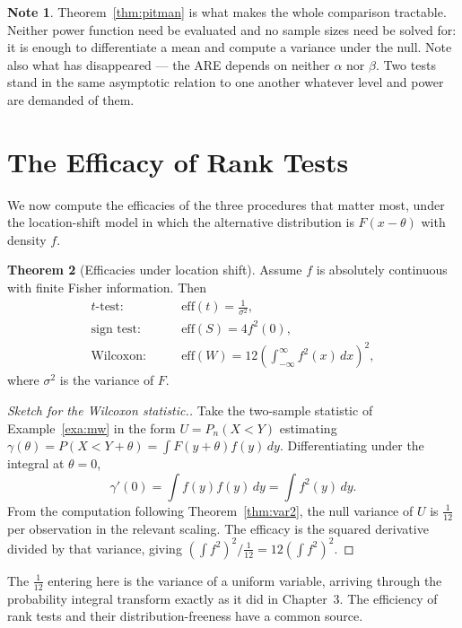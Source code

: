 \documentclass[12pt,a4paper]{report}
\theoremstyle{definition}
\newtheorem{thm}{Theorem}[section]
\newtheorem{note}[thm]{Note}
\theoremstyle{plain}
\begin{document}
\begin{note}
Theorem~\ref{thm:pitman} is what makes the whole comparison tractable. Neither
power function need be evaluated and no sample sizes need be solved for: it is
enough to differentiate a mean and compute a variance under the null. Note also
what has disappeared --- the ARE depends on neither $\alpha$ nor $\beta$. Two
tests stand in the same asymptotic relation to one another whatever level and
power are demanded of them.
\end{note}

\section{The Efficacy of Rank Tests}

We now compute the efficacies of the three procedures that matter most, under
the location-shift model in which the alternative distribution is
$F(x-\theta)$ with density $f$.

\begin{thm}[Efficacies under location shift]
\label{thm:effs}
Assume $f$ is absolutely continuous with finite Fisher information. Then
\begin{align*}
\text{$t$-test:}\qquad
&\mathrm{eff}(t) = \frac{1}{\sigma^{2}}, \\[4pt]
\text{sign test:}\qquad
&\mathrm{eff}(S) = 4f^{2}(0), \\[4pt]
\text{Wilcoxon:}\qquad
&\mathrm{eff}(W) = 12\left(\int^{\infty}_{-\infty}f^{2}(x)\,dx\right)^{2},
\end{align*}
where $\sigma^{2}$ is the variance of $F$.
\end{thm}

\begin{proof}[Sketch for the Wilcoxon statistic.]
Take the two-sample statistic of Example~\ref{exa:mw} in the form
$U = P_n(X<Y)$ estimating $\gamma(\theta) = P(X < Y + \theta)
= \int F(y+\theta)f(y)\,dy$. Differentiating under the integral at
$\theta = 0$,
$$\gamma'(0) = \int f(y)f(y)\,dy = \int f^{2}(y)\,dy .$$
From the computation following Theorem~\ref{thm:var2}, the null variance of
$U$ is $\tfrac{1}{12}$ per observation in the relevant scaling. The efficacy is
the squared derivative divided by that variance, giving
$\left(\int f^{2}\right)^{2}\big/\tfrac{1}{12} = 12\left(\int f^{2}\right)^{2}$.
\end{proof}

The $\tfrac{1}{12}$ entering here is the variance of a uniform variable, arriving
through the probability integral transform exactly as it did in
Chapter~3. The efficiency of rank tests and their distribution-freeness have a
common source.
\end{document}
